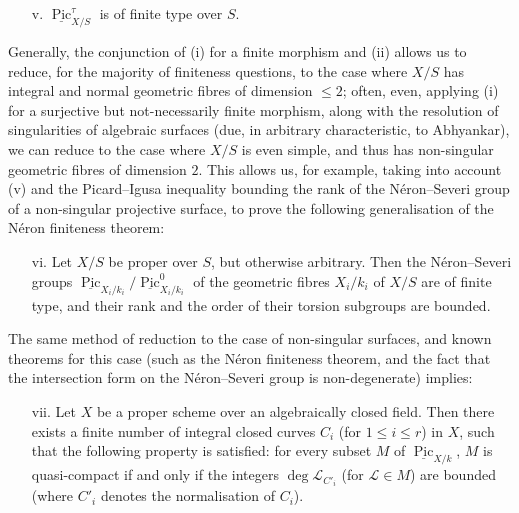 \begin{remark}
    \begin{enumerate}
        \item [v.] $\underline{\operatorname{Pic}}_{X/S}^\tau$ is of finite type over $S$.
    \end{enumerate}

    Generally, the conjunction of (i) for a finite morphism and (ii) allows us to reduce, for the majority of finiteness questions, to the case where $X/S$ has integral and normal geometric fibres of dimension $\leqslant2$;
    often, even, applying (i) for a surjective but not-necessarily finite morphism, along with the resolution of singularities of algebraic surfaces (due, in arbitrary characteristic, to Abhyankar), we can reduce to the case where $X/S$ is even simple, and thus has non-singular geometric fibres of dimension $2$.
    This allows us, for example, taking into account (v) and the Picard–Igusa inequality bounding the rank of the Néron–Severi group of a non-singular projective surface, to prove the following generalisation of the Néron finiteness theorem:

    \begin{enumerate}
        \item [vi.] Let $X/S$ be proper over $S$, but otherwise arbitrary.
              Then the Néron–Severi groups $\underline{\operatorname{Pic}}_{X_i/k_i}/\underline{\operatorname{Pic}}_{X_i/k_i}^0$ of the geometric fibres $X_i/k_i$ of $X/S$ are of finite type, and their rank and the order of their torsion subgroups are bounded.
    \end{enumerate}

    The same method of reduction to the case of non-singular surfaces, and known theorems for this case (such as the Néron finiteness theorem, and the fact that the intersection form on the Néron–Severi group is non-degenerate) implies:

    \begin{enumerate}
        \item [vii.] Let $X$ be a proper scheme over an algebraically closed field.
              Then there exists a finite number of integral closed curves $C_i$ (for $1\leqslant i\leqslant r$) in $X$, such that the following property is satisfied:
              for every subset $M$ of $\underline{\operatorname{Pic}}_{X/k}$, $M$ is quasi-compact if and only if the integers $\deg\mathcal{L}_{C'_i}$ (for $\mathcal{L}\in M$) are bounded (where $C'_i$ denotes the normalisation of $C_i$).
    \end{enumerate}


\end{remark}
